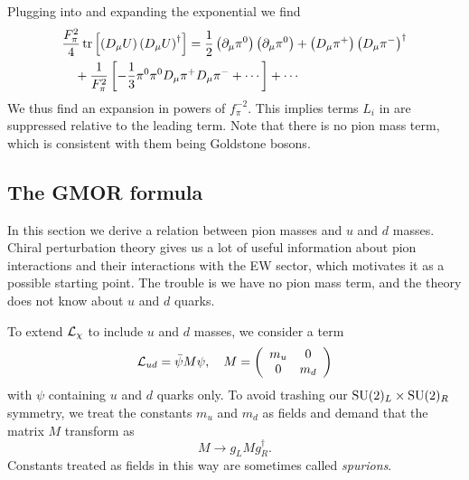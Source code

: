 Plugging  into  and expanding the
exponential we find
\begin{equation}\begin{aligned}
& \frac{F_\pi^2}{4} \tr\left[\left(D_\mu U\right)\left(D_\mu U\right)^{\dagger}\right]
=\frac{1}{2}\left(\partial_\mu \pi^0\right)\left(\partial_\mu \pi^0\right)+\left(D_\mu \pi^{+}\right)\left(D_\mu \pi^{-}\right)^{\dagger} \\
& \quad+\frac{1}{F_\pi^2}\left[-\frac{1}{3} \pi^0 \pi^0 D_\mu \pi^{+} D_\mu
\pi^{-}+\cdots\right]+\cdots
\end{aligned}\end{equation}
We thus find an expansion in powers of $f_\pi^{-2}$. This implies terms $L_i$ in
 are suppressed relative to the leading term.
Note that there is no pion mass term, which is consistent with them being
Goldstone bosons.

\subsection{The GMOR formula}

In this section we derive a relation between pion masses and $u$ and $d$ masses.
Chiral perturbation theory gives us a lot of useful information about pion
interactions and their interactions with the EW sector, which motivates it as a
possible starting point. The trouble is we have no pion mass term, and the
theory does not know about $u$ and $d$ quarks.

To extend $\mathcal{L}_\chi$ to include $u$ and $d$ masses, we consider a term
\begin{equation}
\mathcal{L}_{ud}=\bar{\psi} M \psi, \quad M=\left(\begin{array}{cc}
m_u & 0 \\
0 & m_d
\end{array}\right)
\end{equation}
with $\psi$ containing $u$ and $d$ quarks only. To avoid trashing our
$\operatorname{SU}(2)_L\times\operatorname{SU}(2)_R$ symmetry, we treat the constants $m_u$ and $m_d$ as
fields and demand that the matrix $M$ transform as
\begin{equation}
M\to g_LMg_R^\dagger.
\end{equation}
Constants treated as fields in this way are sometimes called {\it
spurions}. 

